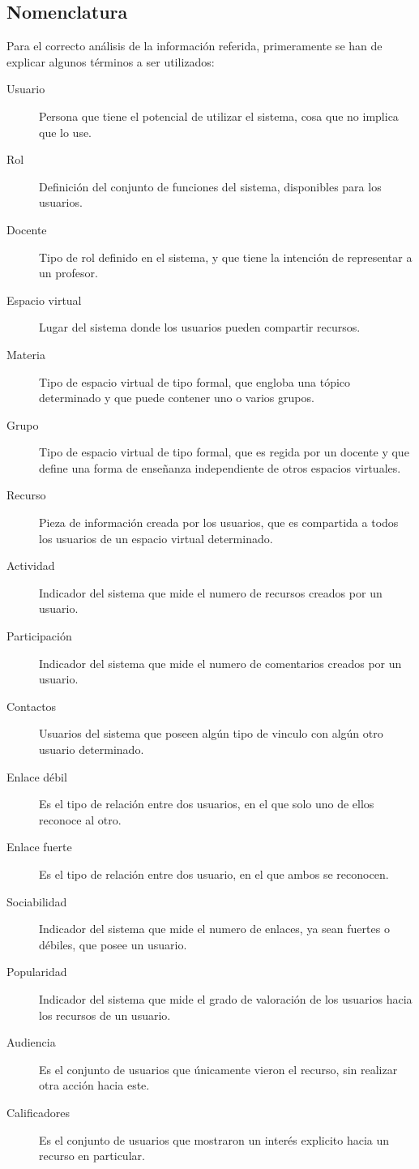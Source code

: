 \subsection{Nomenclatura}
Para el correcto an\'alisis de la informaci\'on referida, primeramente se han de explicar algunos t\'erminos a ser utilizados:
\begin{description}
    \item [Usuario] Persona que tiene el potencial de utilizar el sistema, cosa que no implica que lo use.
    \item [Rol] Definici\'on del conjunto de funciones del sistema, disponibles para los usuarios.
    \item [Docente] Tipo de rol definido en el sistema, y que tiene la intenci\'on de representar a un profesor.
    \item [Espacio virtual] Lugar del sistema donde los usuarios pueden compartir recursos.
    \item [Materia] Tipo de espacio virtual de tipo formal, que engloba una t\'opico determinado y que puede contener uno o varios grupos.
    \item [Grupo] Tipo de espacio virtual de tipo formal, que es regida por un docente y que define una forma de ense\~nanza independiente de otros espacios virtuales.
    \item [Recurso] Pieza de informaci\'on creada por los usuarios, que es compartida a todos los usuarios de un espacio virtual determinado.
    \item [Actividad] Indicador del sistema que mide el numero de recursos creados por un usuario.
    \item [Participaci\'on] Indicador del sistema que mide el numero de comentarios creados por un usuario.
    \item [Contactos] Usuarios del sistema que poseen alg\'un tipo de vinculo con alg\'un otro usuario determinado.
    \item [Enlace d\'ebil] Es el tipo de relaci\'on entre dos usuarios, en el que solo uno de ellos reconoce al otro.
    \item [Enlace fuerte] Es el tipo de relaci\'on entre dos usuario, en el que ambos se reconocen.
    \item [Sociabilidad] Indicador del sistema que mide el numero de enlaces, ya sean fuertes o d\'ebiles, que posee un usuario.
    \item [Popularidad] Indicador del sistema que mide el grado de valoraci\'on de los usuarios hacia los recursos de un usuario.
    \item [Audiencia] Es el conjunto de usuarios que \'unicamente vieron el recurso, sin realizar otra acci\'on hacia este.
    \item [Calificadores] Es el conjunto de usuarios que mostraron un inter\'es explicito hacia un recurso en particular.
\end{description}

